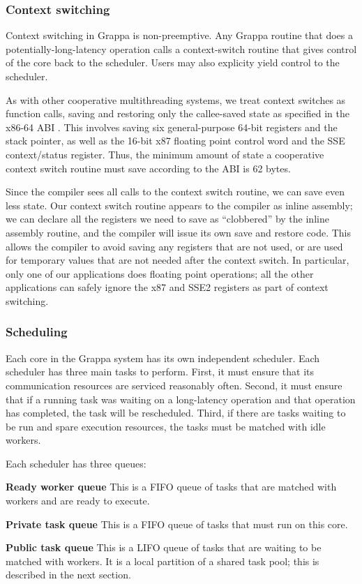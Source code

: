 \subsubsection{Context switching}

Context switching in Grappa is non-preemptive. Any Grappa routine that
does a potentially-long-latency operation calls a context-switch
routine that gives control of the core back to the scheduler. Users
may also explicity yield control to the scheduler.

As with other cooperative multithreading systems, we treat context
switches as function calls, saving and restoring only the callee-saved
state as specified in the x86-64 ABI . This involves saving
six general-purpose 64-bit registers and the stack pointer, as well as
the 16-bit x87 floating point control word and the SSE context/status
register. Thus, the minimum amount of state a cooperative context
switch routine must save according to the ABI is 62 bytes.

Since the compiler sees all calls to the context switch routine, we
can save even less state. Our context switch routine appears to the
compiler as inline assembly; we can declare all the registers we need
to save as ``clobbered'' by the inline assembly routine, and the
compiler will issue its own save and restore code. This allows the
compiler to avoid saving any registers that are not used, or are used
for temporary values that are not needed after the context switch. In
particular, only one of our applications does floating point
operations; all the other applications can safely ignore the x87 and
SSE2 registers as part of context switching.

\subsubsection{Scheduling}

Each core in the Grappa system has its own independent scheduler. Each
scheduler has three main tasks to perform.  First, it must ensure that
its communication resources are serviced reasonably often. Second, it
must ensure that if a running task was waiting on a long-latency
operation and that operation has completed, the task will be
rescheduled. Third, if there are tasks waiting to be run and spare
execution resources, the tasks must be matched with idle workers.

Each scheduler has three queues:
\begin{description}
\item{\bf Ready worker queue} This is a FIFO queue of tasks that are
  matched with workers and are ready to execute.
\item{\bf Private task queue} This is a FIFO queue of tasks that must run on this core.
\item{\bf Public task queue} This is a LIFO queue of tasks that are
  waiting to be matched with workers. It is a local partition of a shared
  task pool; this is described in the next section.
\end{description}

